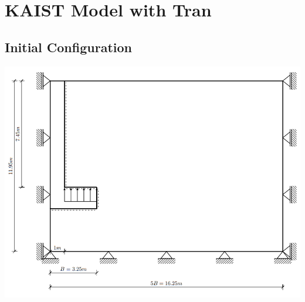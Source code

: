 \documentclass[a4paper, nobind]{templates/ociamthesis}
\begin{document}
\hypertarget{kaist-model-with-tran}{%
\chapter{KAIST Model with Tran}\label{kaist-model-with-tran}}

\hypertarget{initial-configuration}{%
\section{Initial Configuration}\label{initial-configuration}}

\includegraphics[width=1\linewidth]{myfigureeeeee/boundary}
\end{document}
